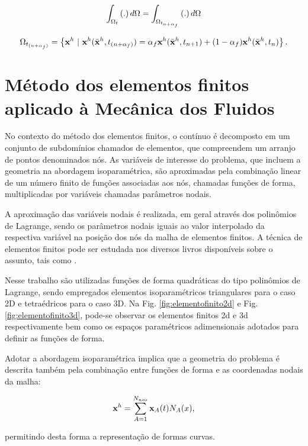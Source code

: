 \documentclass[tese_patricia]{subfiles}%
\begin{document}
\begin{align}
\int_{\Omega_{t}} \left(.\right) d\Omega = \int_{\Omega_{t_{n+\alpha_{f}}}} \left(.\right) d\Omega
\end{align}

\begin{align}
\Omega_{t_{(n+\alpha_f)}} = \left\{\mathbf{x}^h \  |\  \mathbf{x}^h(\bar{\mathbf{x}}^h,t_{(n+\alpha_f)}) = \alpha_f \mathbf{x}^h(\bar{\mathbf{x}}^h,t_{n+1}) + (1-\alpha_f) \mathbf{x}^h(\bar{\mathbf{x}}^h,t_n)  \right\}.
\end{align}

\section{Método dos elementos finitos aplicado à Mecânica dos Fluidos}


No contexto do método dos elementos finitos, o contínuo é decomposto em um conjunto de subdomínios chamados de elementos, que compreendem um arranjo de pontos denominados nós. As variáveis de interesse do problema, que incluem a geometria na abordagem isoparamétrica, são aproximadas pela combinação linear de um número finito de funções associadas aos nós, chamadas funções de forma, multiplicadas por variáveis chamadas parâmetros nodais.

A aproximação das variáveis nodais é realizada, em geral através dos polinômios de Lagrange, sendo os parâmetros nodais iguais ao valor interpolado da respectiva variável na posição dos nós da malha de elementos finitos. A técnica de elementos finitos pode ser estudada nos diversos livros disponíveis sobre o assunto, tais como .

Nesse trabalho são utilizadas funções de forma quadráticas do tipo polinômios de Lagrange, sendo empregados elementos isoparamétricos triangulares para o caso 2D e tetraédricos para o caso 3D. Na Fig. \ref{fig:elementofinito2d} e Fig. \ref{fig:elementofinito3d}, pode-se observar os elementos finitos 2d e 3d respectivamente bem como os espaços paramétricos adimensionais adotados para definir as funções de forma. 

Adotar a abordagem isoparamétrica implica que a geometria do problema é descrita também pela combinação entre funções de forma e as coordenadas nodais da malha:

\begin{align}
\mathbf{x}^{h} = \sum_{A = 1}^{N_{nos}} \mathbf{x}_{A}(t)N_{A}(x),
\end{align}

\noindent permitindo desta forma a representação de formas curvas.
\end{document}
